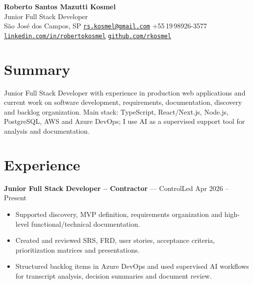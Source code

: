 \documentclass[a4paper,10pt]{article}
\begin{document}

\begin{center}
    {\Huge \textbf{Roberto Santos Mazutti Kosmel}} \\
    \vspace{1mm}
    {\large Junior Full Stack Developer} \\
    \vspace{1mm}
    São José dos Campos, SP \textbar{} \href{mailto:rs.kosmel@gmail.com}{\texttt{rs.kosmel@gmail.com}} \textbar{} +55\,19\,98926-3577 \\
    \href{https://www.linkedin.com/in/robertokosmel/}{\texttt{linkedin.com/in/robertokosmel}} \textbar{} \href{https://github.com/rkosmel}{\texttt{github.com/rkosmel}}
\end{center}

\vspace{1.5mm}

\section*{Summary}
Junior Full Stack Developer with experience in production web applications and current work on software development, requirements, documentation, discovery and backlog organization. Main stack: TypeScript, React/Next.js, Node.js, PostgreSQL, AWS and Azure DevOps; I use AI as a supervised support tool for analysis and documentation.

\section*{Experience}
\textbf{Junior Full Stack Developer -- Contractor} --- ControlLed \hfill Apr 2026 -- Present \\
\begin{itemize}
    \item Supported discovery, MVP definition, requirements organization and high-level functional/technical documentation.
    \item Created and reviewed SRS, FRD, user stories, acceptance criteria, prioritization matrices and presentations.
    \item Structured backlog items in Azure DevOps and used supervised AI workflows for transcript analysis, decision summaries and document review.
\end{itemize}

\vspace{1mm}
\end{document}
